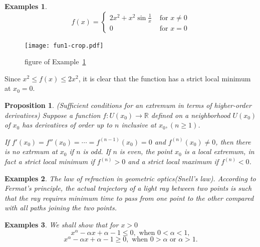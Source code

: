 \documentclass[a4paper,12pt]{article} %
\newtheorem{proposition}{Proposition}[section]
\newtheorem{example}{Examples}
\begin{document}
\begin{example}
    \normalfont
    \[
        \displaystyle
        f(x) = \left\{\begin{array}{cl} 2x^2 + x^2\sin\frac{1}{x} & \text{ for } x \ne 0 \\
                             0 & \text{ for } x =0
        \end{array} \right.
        \]
    \label{ex:ex1}
\end{example}

\graphicspath{ 
    {./fun1/}
}
\begin{figure}[htbp]
    \centering 
    \texttt{[image: fun1-crop.pdf]}
    \label{fig:fig1}
    \caption{figure of Example~\ref{ex:ex1}}
\end{figure}

Since $x^2 \le f(x) \le 2x^2$, it is clear that the function has a strict local 
minimum at $x_0 = 0$.

\begin{proposition}{\rm (Sufficient conditions for an extremum in terms of 
    higher-order derivatives)}
    \normalfont
    Suppose a function $f: U(x_0) \to \mathbb{R}$ defined on a neighborhood 
    $U(x_0)$ of $x_0$ has derivatives of order up to $n$ inclusive at $x_0, (n \ge 1)$.

    If $f'(x_0) = f''(x_0) = \cdots = f^{(n-1)}(x_0) = 0$ and $f^{(n)}(x_0) \ne 0$, then there is 
    no extrmum at $x_0$ if $n$ is odd. If $n$ is even, the point $x_0$ is a local extremum,
    in fact a strict local minimum if $f^{(n)}>0$ and a strict local maximum if 
    $f^{(n)}<0$.
\end{proposition}

\begin{example}
    \normalfont
    The law of refraction in geometric optics(Snell's law). According to 
    Fermat's principle, the actual trajectory of a light ray between two 
    points is such that the ray requires minimum time to pass from one point 
    to the other compared with all paths joining the two points.
\end{example}

\begin{example}
    \normalfont 
    We shall show that for $x > 0$
    \begin{equation}
        x^{\alpha} - \alpha x + \alpha -1 \le 0, \text{ when } 0 < \alpha < 1,
    \end{equation}
    \begin{equation}
        x^{\alpha} - \alpha x + \alpha -1 \ge 0, \text{ when } 0 > \alpha \text{ or } \alpha > 1.
    \end{equation}
\end{example}
\end{document}
